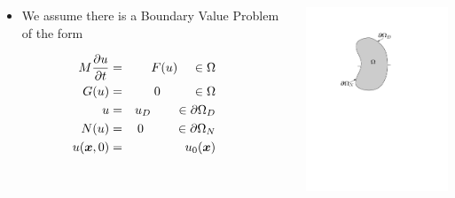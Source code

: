 \begin{frame}
  \begin{columns}[t]
    \begin{block}{}%
      \begin{itemize}
      \item We assume there is a Boundary Value Problem
      of the form %
      \end{itemize}
      \vspace{-.1in}
      \begin{eqnarray}
	\label{eqn:general_pde}
	\nonumber
	M \frac{\partial u}{\partial t} & = & F( u ) \;\;\;\; \in \Omega
        \\
	\nonumber
	G( u ) & = & 0 \;\;\;\;\;\;\;\;\; \in \Omega
	\\
	\nonumber
	u & = & u_D \;\;\;\;\;\;\; \in \partial \Omega_D
	\\
	\nonumber
	N(u) & = & 0 \;\;\;\;\;\;\;\;\; \in \partial \Omega_N
 	\\
 	\nonumber
 	u({\boldsymbol{x}}, 0) & = & u_0({\boldsymbol{x}}) 
      \end{eqnarray}
    \end{block}
      \begin{center}
	\includegraphics[viewport=140 420 400 685,clip=true,width=2in]{figures/domain2/domain2_input}
      \end{center}
  \end{columns}
\end{frame}
